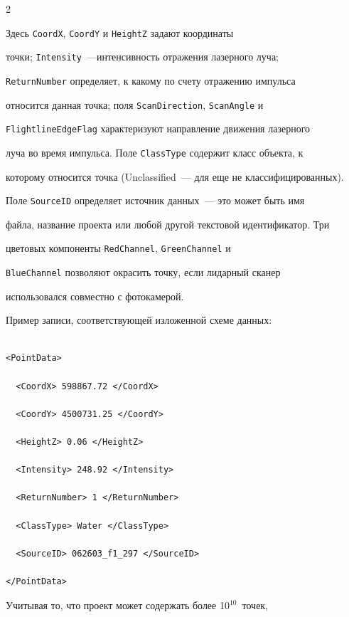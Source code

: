 \begin{multicols}{2}



Здесь \verb"CoordX", \verb*"CoordY" и \verb*"HeightZ" задают координаты 

точки; \verb*"Intensity"~---интенсивность отражения лазерного луча; 

\verb*"ReturnNumber" определяет, к какому по счету отражению импульса 

относится данная точка; поля \verb*"ScanDirection", \verb*"ScanAngle" и 

\verb*"FlightlineEdgeFlag" характеризуют направление движения лазерного 

луча во время импульса. Поле \verb*"ClassType" содержит класс объекта, к 

которому относится точка (Unclassified~--- для еще не классифицированных). 

Поле \verb*"SourceID" определяет источник данных~--- это может быть имя 

файла, название проекта или любой другой текс\-то\-вой идентификатор. Три 

цветовых компоненты \verb*"RedChannel", \verb*"GreenChannel" и 

\verb*"BlueChannel" позволяют окрасить точку, если лидарный сканер 

использовался совместно с фотокамерой.



   Пример записи, соответствующей изложенной схеме данных:

   

   \noindent

   \begin{verbatim}

<PointData>

  <CoordX> 598867.72 </CoordX>

  <CoordY> 4500731.25 </CoordY>

  <HeightZ> 0.06 </HeightZ>

  <Intensity> 248.92 </Intensity>

  <ReturnNumber> 1 </ReturnNumber>

  <ClassType> Water </ClassType>

  <SourceID> 062603_f1_297 </SourceID>

</PointData>

   \end{verbatim}

   

   Учитывая то, что проект может содержать более 10$^{10}$~точек, 


\end{multicols}
